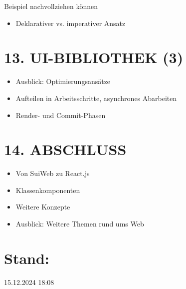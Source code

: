 \documentclass[10pt]{article}
\begin{document}
Beispiel nachvollziehen können

\begin{itemize}
  \item Deklarativer vs. imperativer Ansatz
\end{itemize}

\section*{13. UI-BIBLIOTHEK (3)}
\begin{itemize}
  \item Ausblick: Optimierungsansätze
  \item Aufteilen in Arbeitsschritte, asynchrones Abarbeiten
  \item Render- und Commit-Phasen
\end{itemize}

\section*{14. ABSCHLUSS}
\begin{itemize}
  \item Von SuiWeb zu React.js
  \item Klassenkomponenten
  \item Weitere Konzepte
  \item Ausblick: Weitere Themen rund ums Web
\end{itemize}

\section*{Stand:}
15.12.2024 18:08
\end{document}
